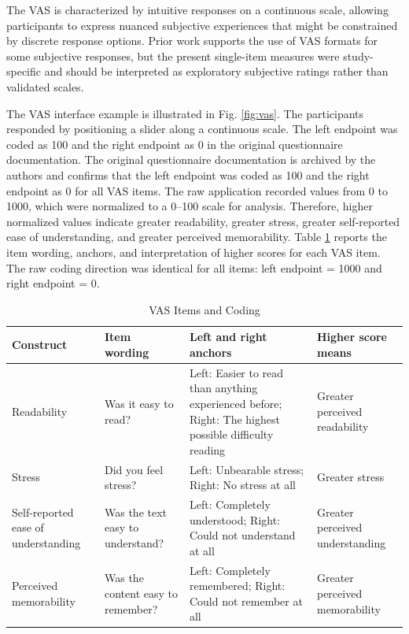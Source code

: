 \documentclass[authoryear]{elsarticle}
\begin{document}
The VAS is characterized by intuitive responses on a continuous scale, allowing participants to express nuanced subjective experiences that might be constrained by discrete response options. Prior work supports the use of VAS formats for some subjective responses, but the present single-item measures were study-specific and should be interpreted as exploratory subjective ratings rather than validated scales.

The VAS interface example is illustrated in Fig. \ref{fig:vas}. The participants responded by positioning a slider along a continuous scale. The left endpoint was coded as 100 and the right endpoint as 0 in the original questionnaire documentation. The original questionnaire documentation is archived by the authors and confirms that the left endpoint was coded as 100 and the right endpoint as 0 for all VAS items. The raw application recorded values from 0 to 1000, which were normalized to a 0--100 scale for analysis. Therefore, higher normalized values indicate greater readability, greater stress, greater self-reported ease of understanding, and greater perceived memorability. Table \ref{tab:vas_codebook} reports the item wording, anchors, and interpretation of higher scores for each VAS item. The raw coding direction was identical for all items: left endpoint = 1000 and right endpoint = 0.

\begin{table}[htbp]
  \centering
  \caption{VAS Items and Coding}
  \label{tab:vas_codebook}
  \begin{tabularx}{\textwidth}{p{}X X p{}}
    \toprule
    Construct & Item wording & Left and right anchors & Higher score means \\
    \midrule
    Readability & Was it easy to read? & Left: Easier to read than anything experienced before; Right: The highest possible difficulty reading & Greater perceived readability \\
    Stress & Did you feel stress? & Left: Unbearable stress; Right: No stress at all & Greater stress \\
    Self-reported ease of understanding & Was the text easy to understand? & Left: Completely understood; Right: Could not understand at all & Greater perceived understanding \\
    Perceived memorability & Was the content easy to remember? & Left: Completely remembered; Right: Could not remember at all & Greater perceived memorability \\
    \bottomrule
  \end{tabularx}
\end{table}
\end{document}
